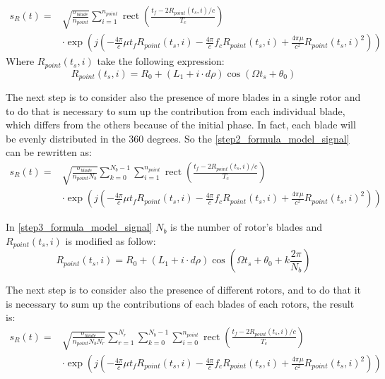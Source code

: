 \begin{equation}
\begin{aligned}
s_{R}(t)=& \sqrt{\frac{\sigma_{blade}}{n_{point}}} \sum_{i=1}^{n_{point}}\operatorname{rect}\left(\frac{t_{f}-2 R_{point}\left(t_{s},i\right) / c}{T_{c}}\right) \\
& \cdot \exp \left(j\left(-\frac{4 \pi}{c} \mu t_{f} R_{point}\left(t_{s},i\right)-\frac{4 \pi}{c} f_{c} R_{point}\left(t_{s},i\right)+\frac{4 \pi \mu}{c^{2}} R_{point}\left(t_{s},i\right)^{2}\right)\right)
\end{aligned}
\label{step_discrete_formula}
\end{equation}
Where $R_{point}(t_s,i)$ take the following expression:
\begin{equation}
R_{point}(t_s,i)=R_{0}+ (L_1+i \cdot d\rho) \cos \left(\Omega t_{s}+\theta_{0}\right)
\end{equation}

The next step is to consider also the presence of more blades in a single rotor and to do that is necessary to sum up the contribution from each individual blade, which differs from the others because of the initial phase. In fact, each blade will be evenly distributed in the 360 degrees. So the \ref{step2_formula_model_signal} can be rewritten as:
\begin{equation}
\begin{aligned}
s_{R}(t)=& \sqrt{\frac{\sigma_{blade}}{n_{point} N_b}} \sum_{k=0}^{N_{b}-1}\sum_{i=1}^{n_{point}}\operatorname{rect}\left(\frac{t_{f}-2 R_{point}\left(t_{s},i\right) / c}{T_{c}}\right) \\
& \cdot \exp \left(j\left(-\frac{4 \pi}{c} \mu t_{f} R_{point}\left(t_{s},i\right)-\frac{4 \pi}{c} f_{c} R_{point}\left(t_{s},i\right)+\frac{4 \pi \mu}{c^{2}} R_{point}\left(t_{s},i\right)^{2}\right)\right)
\end{aligned}
\label{step3_formula_model_signal}
\end{equation}

In \ref{step3_formula_model_signal} $N_{b}$ is the number of rotor's blades and $R_{point}(t_{s},i)$ is modified as follow:
\begin{equation}
R_{point}(t_s,i)=R_{0}+(L_1+i \cdot d\rho) \cos \left(\Omega t_{s}+\theta_{0} + k \frac{2\pi}{N_{b}}\right)
\label{range_equation_step2}
\end{equation}

The next step is to consider also the presence of different rotors, and to do that it is necessary to sum up the contributions of each blades of each rotors, the result is:
\begin{equation}
\begin{aligned}
s_{R}(t)=& \sqrt{\frac{\sigma_{blade}}{n_{point} N_b N_r}} \sum_{r=1}^{N_{r}}\sum_{k=0}^{N_{b}-1}\sum_{i=0}^{n_{point}}\operatorname{rect}\left(\frac{t_{f}-2 R_{point}\left(t_{s},i\right) / c}{T_{c}}\right) \\
& \cdot \exp \left(j\left(-\frac{4 \pi}{c} \mu t_{f} R_{point}\left(t_{s},i\right)-\frac{4 \pi}{c} f_{c} R_{point}\left(t_{s},i\right)+\frac{4 \pi \mu}{c^{2}} R_{point}\left(t_{s},i\right)^{2}\right)\right)
\end{aligned}
\label{step4_formula_model_signal}
\end{equation}

